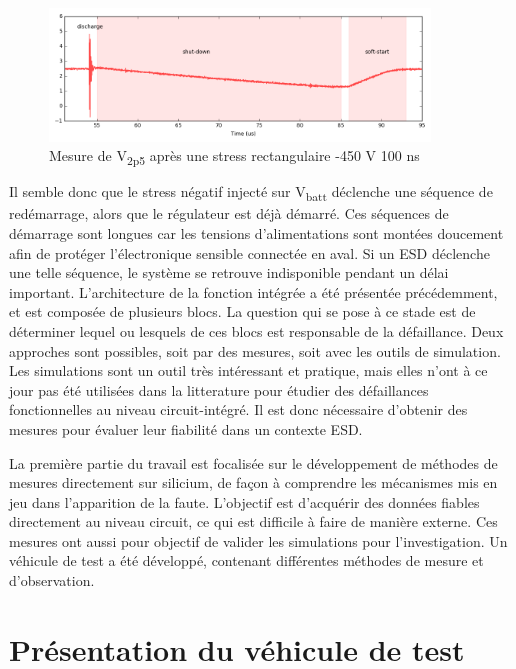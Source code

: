 \begin{figure}[!h]
  \centering
  \includegraphics[width=0.9\textwidth]{src/1/figures/v2p5_measure.png}
  \caption{Mesure de V\textsubscript{2p5} après une stress rectangulaire -450 V 100 ns}
  \label{fig:meas-reset-v2p5}
\end{figure}

Il semble donc que le stress négatif injecté sur V\textsubscript{batt} déclenche une séquence de redémarrage, alors que le régulateur est déjà démarré.
Ces séquences de démarrage sont longues car les tensions d'alimentations sont montées doucement afin de protéger l'électronique sensible connectée en aval.
Si un ESD déclenche une telle séquence, le système se retrouve indisponible pendant un délai important.
L'architecture de la fonction intégrée a été présentée précédemment, et est composée de plusieurs blocs.
La question qui se pose à ce stade est de déterminer lequel ou lesquels de ces blocs est responsable de la défaillance.
Deux approches sont possibles, soit par des mesures, soit avec les outils de simulation.
Les simulations sont un outil très intéressant et pratique, mais elles n'ont à ce jour pas été utilisées dans la litterature pour étudier des défaillances fonctionnelles au niveau circuit-intégré.
Il est donc nécessaire d'obtenir des mesures pour évaluer leur fiabilité dans un contexte ESD.

La première partie du travail est focalisée sur le développement de méthodes de mesures directement sur silicium, de façon à comprendre les mécanismes mis en jeu dans l'apparition de la faute.
L'objectif est d'acquérir des données fiables directement au niveau circuit, ce qui est difficile à faire de manière externe.
Ces mesures ont aussi pour objectif de valider les simulations pour l'investigation.
Un véhicule de test a été développé, contenant différentes méthodes de mesure et d'observation.

\section{Présentation du véhicule de test}

